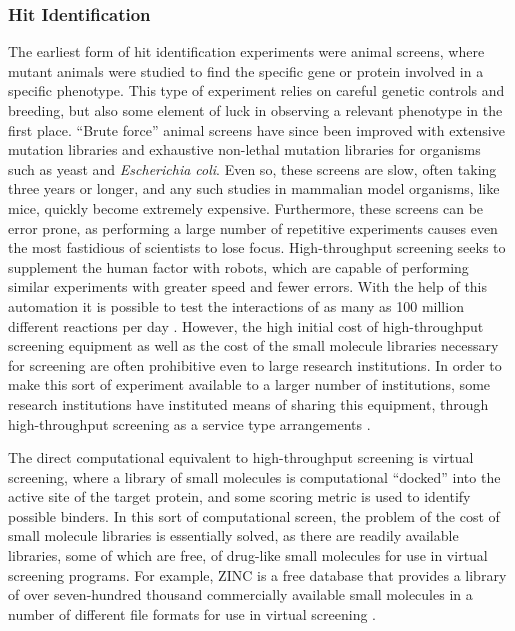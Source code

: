 \subsubsection{Hit Identification}
\label{subsubsection:hit_identification}
The earliest form of hit identification experiments were animal screens, where mutant animals were studied to find the specific gene or protein involved in a specific phenotype.
This type of experiment relies on careful genetic controls and breeding, but also some element of luck in observing a relevant phenotype in the first place.
``Brute force'' animal screens have since been improved with extensive mutation libraries and exhaustive non-lethal mutation libraries for organisms such as yeast and {\it Escherichia coli}.
Even so, these screens are slow, often taking three years or longer, and any such studies in mammalian model organisms, like mice, quickly become extremely expensive.
Furthermore, these screens can be error prone, as performing a large number of repetitive experiments causes even the most fastidious of scientists to lose focus.
High-throughput screening seeks to supplement the human factor with robots, which are capable of performing similar experiments with greater speed and fewer errors.
With the help of this automation it is possible to test the interactions of as many as 100 million different reactions per day \cite{agresti2010ultrahigh}.
However, the high initial cost of high-throughput screening equipment as well as the cost of the small molecule libraries necessary for screening are often prohibitive even to large research institutions.
In order to make this sort of experiment available to a larger number of institutions, some research institutions have instituted means of sharing this equipment, through high-throughput screening as a service type arrangements \cite{htsrc,mssr}.

The direct computational equivalent to high-throughput screening is virtual screening, where a library of small molecules is computational ``docked'' into the active site of the target protein, and some scoring metric is used to identify possible binders.
In this sort of computational screen, the problem of the cost of small molecule libraries is essentially solved, as there are readily available libraries, some of which are free, of drug-like small molecules for use in virtual screening programs.
For example, ZINC is a free database that provides a library of over seven-hundred thousand commercially available small molecules in a number of different file formats for use in virtual screening \cite{irwin2005zinc}.

